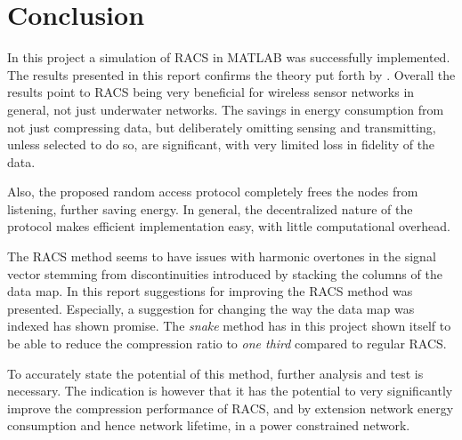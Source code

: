 \documentclass[Main]{subfiles}
\begin{document}
	\section{Conclusion} %
	\label{sec:conclusion}

		In this project a simulation of RACS in MATLAB was successfully implemented.
		The results presented in this report confirms the theory put forth by \cite{Fazel2011}.
		Overall the results point to RACS being very beneficial for wireless sensor networks in general, not just underwater networks.
		The savings in energy consumption from not just compressing data, but deliberately omitting sensing and transmitting, unless selected to do so, are significant, with very limited loss in fidelity of the data.
		
		Also, the proposed random access protocol completely frees the nodes from listening, further saving energy.
		In general, the decentralized nature of the protocol makes efficient implementation easy, with little computational overhead.

		The RACS method seems to have issues with harmonic overtones in the signal vector stemming from discontinuities introduced by stacking the columns of the data map.
		In this report suggestions for improving the RACS method was presented.
		Especially, a suggestion for changing the way the data map was indexed has shown promise.
		The \emph{snake} method has in this project shown itself to be able to reduce the compression ratio to \emph{one third} compared to regular RACS.
		
		To accurately state the potential of this method, further analysis and test is necessary.
		The indication is however that it has the potential to very significantly improve the compression performance of RACS, and by extension network energy consumption and hence network lifetime, in a power constrained network.

				
\end{document}
